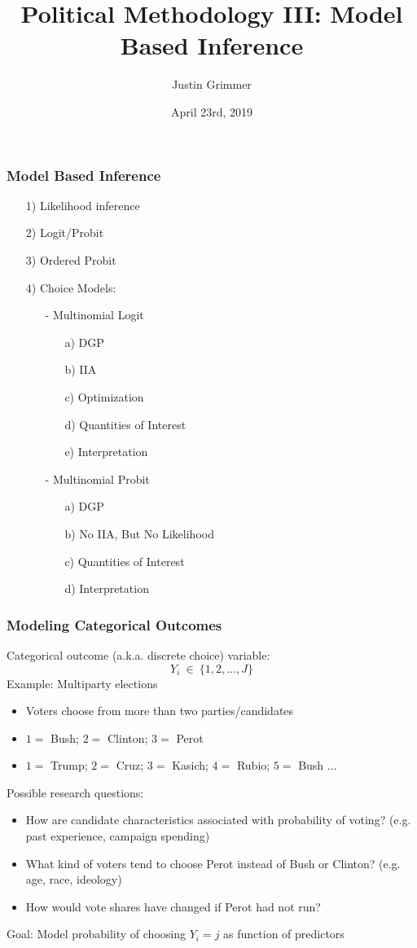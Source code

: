 \documentclass{beamer}
\title[Methodology III] %
{Political Methodology III: Model Based Inference}
\author{Justin Grimmer}
\institute[Stanford University]{Professor\\Department of Political Science \\  Stanford University}
\date{April 23rd, 2019}
\begin{document}
\begin{frame}
\titlepage
\end{frame}


\begin{frame}
\frametitle{Model Based Inference}

\begin{itemize}
\item[1)] Likelihood inference
\item[2)] Logit/Probit
\item[3)] Ordered Probit
\item[4)] Choice Models:
\begin{itemize}
\item[-] Multinomial Logit
\begin{itemize}
\item[a)] DGP
\item[b)] IIA
\item[c)] Optimization
\item[d)] Quantities of Interest
\item[e)] Interpretation
\end{itemize}
\item[-] Multinomial Probit
\begin{itemize}
\item[a)] DGP
\item[b)] No IIA, But No Likelihood
\item[c)] Quantities of Interest
\item[d)] Interpretation
\end{itemize}
\end{itemize}
\end{itemize}

\end{frame}



\begin{frame}
\frametitle{Modeling Categorical Outcomes}
Categorical outcome (a.k.a. discrete choice) variable:
    $$ Y_i \ \in \ \{1, 2,..., J\}$$
\pause
Example: Multiparty elections
\begin{itemize}
\item Voters choose from more than two parties/candidates
\item $1=$ Bush; $2=$ Clinton; $3=$ Perot
\item $1=$ Trump; $2=$ Cruz; $3=$ Kasich; $4=$ Rubio; $5=$ Bush ...
\end{itemize}
\pause
\medskip
Possible research questions:
  \begin{itemize}
  \item How are candidate characteristics associated with
    probability of voting? (e.g. past experience, campaign spending)
  \item What kind of voters tend to choose Perot instead of Bush
    or Clinton? (e.g. age, race, ideology)
  \item How would vote shares have changed if Perot had not run?
  \end{itemize}
\medskip
\pause
Goal: Model probability of choosing $Y_i = j$ as function of predictors

\end{frame}
\end{document}
